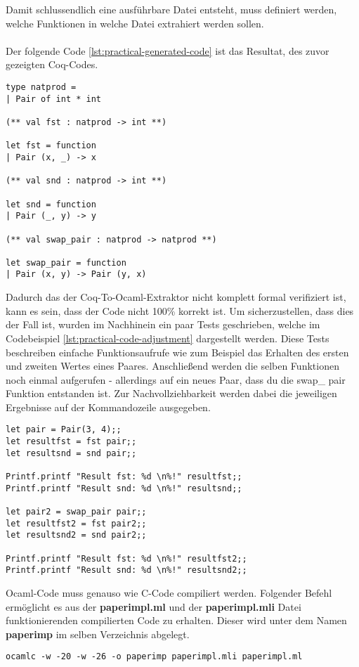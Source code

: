 Damit schlussendlich eine ausführbare Datei entsteht, muss definiert werden, welche Funktionen in welche Datei extrahiert werden sollen.\\
\\
Der folgende Code \ref{lst:practical-generated-code} ist das Resultat, des zuvor gezeigten Coq-Codes. 
\begin{lstlisting}[language=coq,firstnumber=1,caption=Ocaml Code anpassen,label=lst:practical-generated-code]
type natprod =
| Pair of int * int

(** val fst : natprod -> int **)

let fst = function
| Pair (x, _) -> x

(** val snd : natprod -> int **)

let snd = function
| Pair (_, y) -> y

(** val swap_pair : natprod -> natprod **)

let swap_pair = function
| Pair (x, y) -> Pair (y, x)
\end{lstlisting}
Dadurch das der Coq-To-Ocaml-Extraktor nicht komplett formal verifiziert ist, kann es sein, dass der Code nicht 100\% korrekt ist. Um sicherzustellen, dass dies der Fall ist, wurden im Nachhinein ein paar Tests geschrieben, welche im Codebeispiel \ref{lst:practical-code-adjustment} dargestellt werden. Diese Tests beschreiben einfache Funktionsaufrufe wie zum Beispiel das Erhalten des ersten und zweiten Wertes eines Paares. Anschließend werden die selben Funktionen noch einmal aufgerufen - allerdings auf ein neues Paar, dass du die swap\_	pair Funktion entstanden ist. Zur Nachvollziehbarkeit werden dabei die jeweiligen Ergebnisse auf der Kommandozeile ausgegeben.
\begin{lstlisting}[language=coq,firstnumber=1,caption=Ocaml Code anpassen,label=lst:practical-code-adjustment]
let pair = Pair(3, 4);;
let resultfst = fst pair;;
let resultsnd = snd pair;;

Printf.printf "Result fst: %d \n%!" resultfst;;
Printf.printf "Result snd: %d \n%!" resultsnd;;

let pair2 = swap_pair pair;;
let resultfst2 = fst pair2;;
let resultsnd2 = snd pair2;;

Printf.printf "Result fst: %d \n%!" resultfst2;;
Printf.printf "Result snd: %d \n%!" resultsnd2;;
\end{lstlisting}
Ocaml-Code muss genauso wie C-Code compiliert werden. Folgender Befehl ermöglicht es aus der \textbf{paperimpl.ml} und der \textbf{paperimpl.mli} Datei funktionierenden compilierten Code zu erhalten. Dieser wird unter dem Namen \textbf{paperimp} im selben Verzeichnis abgelegt.
\\
\begin{lstlisting}[language=coq,firstnumber=1,caption=Ocaml Code compilieren,label=lst:practical-code-compilation]
ocamlc -w -20 -w -26 -o paperimp paperimpl.mli paperimpl.ml
\end{lstlisting}


